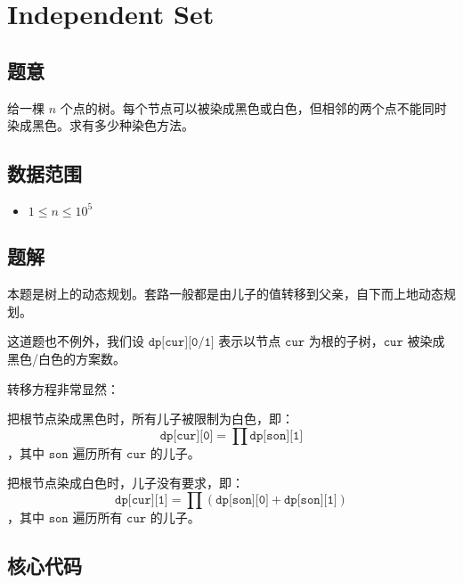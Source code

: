 \section{Independent Set}
\subsection*{题意}
给一棵 $n$ 个点的树。每个节点可以被染成黑色或白色，但相邻的两个点不能同时染成黑色。求有多少种染色方法。
\subsection*{数据范围}
\begin{itemize}
\item $1 \leq n \leq 10^5$
\end{itemize}

\subsection*{题解}

本题是树上的动态规划。套路一般都是由儿子的值转移到父亲，自下而上地动态规划。

这道题也不例外，我们设 $\texttt{dp[cur][0/1]}$ 表示以节点 $\texttt{cur}$ 为根的子树，$\texttt{cur}$ 被染成黑色/白色的方案数。

转移方程非常显然：

把根节点染成黑色时，所有儿子被限制为白色，即：
$$
\texttt{dp[cur][0]} = \prod \texttt{dp[son][1]} 
$$
，其中 $\texttt{son}$ 遍历所有 $\texttt{cur}$ 的儿子。

把根节点染成白色时，儿子没有要求，即：
$$
\texttt{dp[cur][1]} = \prod (\texttt{dp[son][0]} + \texttt{dp[son][1]})
$$
，其中 $\texttt{son}$ 遍历所有 $\texttt{cur}$ 的儿子。

\subsection*{核心代码}
\inputminted[linenos,autogobble]{cpp}{../Code/P.cpp}
\newpage